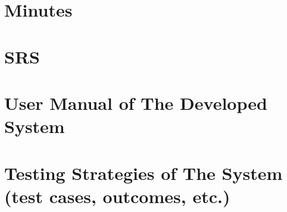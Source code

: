 \documentclass[12pt,a4paper]{report}
\begin{document}
\appendix

\chapter{Minutes}

\chapter{SRS}

\chapter{User Manual of The Developed System}

\chapter{Testing Strategies of The System (test cases, outcomes, etc.)}




\end{document}
